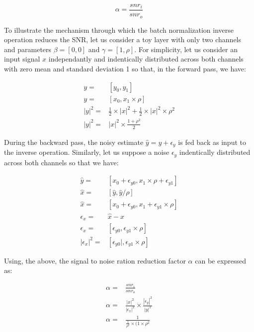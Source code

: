 \documentclass[twocolumn]{bmcart}
\begin{document}
\begin{equation}
	\alpha = \frac{snr_i}{snr_o}
\end{equation}

To illustrate the mechanism through which the batch normalization inverse operation reduces the SNR, let us consider a toy layer with only two channels and parameters $\beta=[0,0]$ and $\gamma = [1, \rho]$. For simplicity, let us consider an input signal $x$ independantly and indentically distributed across both channels with zero mean and standard deviation 1 so that, in the forward pass, we have:

\begin{subequations}
\begin{align}
   y       =& [y_0, y_1] 					                   										 \\
   y       =& [x_0, x_1 \times \rho] 															 \\
   |y|^2 =& \frac{1}{2} \times |x|^2 + \frac{1}{2} \times |x|^2 \times \rho^2 \\
   |y|^2 =&|x|^2  \times \frac{1+\rho^2}{2}
\end{align}
\end{subequations}

During the backward pass, the noisy estimate $\hat{y}=y+\epsilon_y$ is fed back as input to the inverse operation. Similarly, let us suppose a noise $\epsilon_y$ indentically distributed across both channels so that we have:

\begin{subequations}
\begin{align}
\hat{y}           =& [ x_0 + \epsilon_{y0}, x_1 \times \rho + \epsilon_{y1} ] \\
\hat{x}           =& [ \hat{y}, \hat{y} / \rho] \\
\hat{x}           =& [ x_0 + \epsilon_{y0}, x_1 + \epsilon_{y1} \times \rho ]\\
\epsilon_x      =& \hat{x} - x\\
\epsilon_x      =& [ \epsilon_{y0}, \epsilon_{y1} \times \rho ]\\
|\epsilon_x|^2 =& [ \epsilon_{y0}|, \epsilon_{y1} \times \rho ]
\end{align}
\end{subequations}

Using, the above, the signal to noise ration reduction factor $\alpha$ can be expressed as:

\begin{subequations}
	\begin{align}
	\alpha =& \frac{snr_i}{snr_o} \\
	\alpha =& \frac{|x|^2}{|\epsilon_x|^2} \times  \frac{|\epsilon_y|^2}{|y|^2} \\
    \alpha =& \frac{1}{\frac{1}{\rho^2}\times (1 \times \rho^2}
	\end{align}
\end{subequations}
\end{document}
